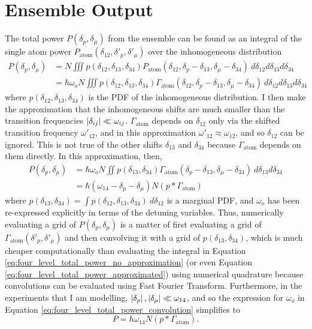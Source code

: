 \section{Ensemble Output}
The total power $P(\delta_p, \delta_\mu)$ from the ensemble can be found as an integral of the single atom power $P_\text{atom}(\delta_{12}, \delta'_p, \delta'_\mu)$ over the inhomogeneous distribution
\begin{align}
    P(\delta_p, \delta_\mu) &= N \iiint p(\delta_{12}, \delta_{13}, \delta_{34}) P_\text{atom}(\delta_{12}, \delta_p-\delta_{13}, \delta_\mu-\delta_{34})\:d\delta_{12}d\delta_{13}d\delta_{34} \label{eq:four_level_total_power_no_approximation}\\
    &= \hbar\omega_oN \iiint p(\delta_{12}, \delta_{13}, \delta_{34}) \Gamma_\text{atom}(\delta_{12}, \delta_p-\delta_{13}, \delta_\mu-\delta_{34})\:d\delta_{12}d\delta_{13}d\delta_{34}
\end{align}
where $p(\delta_{12}, \delta_{13}, \delta_{34})$ is the PDF of the inhomogeneous distribution. I then make the approximation that the inhomogeneous shifts are much smaller than the transition frequencies $\left|\delta_{ij}\right| \ll \omega_{ij}$. $\Gamma_\text{atom}$ depends on $\delta_{12}$ only via the shifted transition frequency $\omega'_{12}$, and in this approximation $\omega'_{12} \approx \omega_{12}$, and so $\delta_{12}$ can be ignored. This is not true of the other shifts $\delta_{13}$ and $\delta_{34}$ because $\Gamma_\text{atom}$ depends on them directly. In this approximation, then,
\begin{align}
    P(\delta_p, \delta_\mu) &= \hbar\omega_{o}N \iint p(\delta_{13}, \delta_{34}) \Gamma_\text{atom}(\delta_p-\delta_{13}, \delta_\mu-\delta_{34})\:d\delta_{13}d\delta_{34} \label{eq:four_level_total_power_approximated}\\
    &= \hbar(\omega_{14}-\delta_p-\delta_\mu)N (p * \Gamma_\text{atom}) \label{eq:four_level_total_power_convolution}
\end{align}
where $p(\delta_{13}, \delta_{34}) = \int p(\delta_{12}, \delta_{13}, \delta_{34})\:d\delta_{12}$ is a marginal PDF, and $\omega_o$ has been re-expressed explicitly in terms of the detuning variables. Thus, numerically evaluating a grid of $P(\delta_p, \delta_\mu)$ is a matter of first evaluating a grid of $\Gamma_\text{atom}(\delta'_p, \delta'_\mu)$ and then convolving it with a grid of $p(\delta_{13}, \delta_{34})$, which is much cheaper computationally than evaluating the integral in Equation \ref{eq:four_level_total_power_no_approximation} (or even Equation \ref{eq:four_level_total_power_approximated}) using numerical quadrature because convolutions can be evaluated using Fast Fourier Transform. Furthermore, in the experiments that I am modelling, $\left|\delta_p\right|, \left|\delta_\mu\right| \ll \omega_{14}$, and so the expression for $\omega_o$ in Equation \ref{eq:four_level_total_power_convolution} simplifies to
\begin{equation}
    P = \hbar\omega_{14}N (p * \Gamma_\text{atom}). \label{eq:four_level_total_power_convolution_approximate}
\end{equation}

